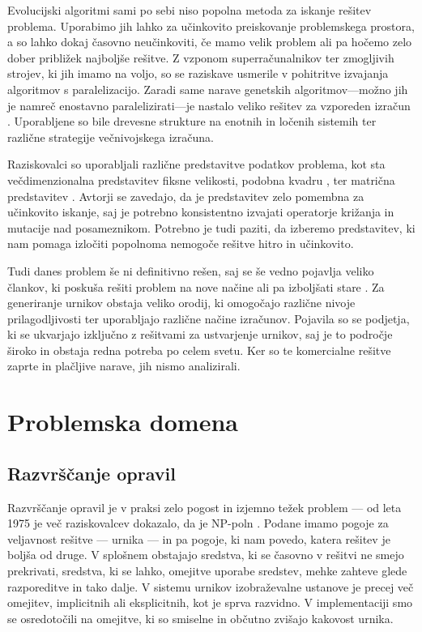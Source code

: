 \documentclass[a4paper,12pt]{book}
\begin{document}
Evolucijski algoritmi sami po sebi niso popolna metoda za iskanje rešitev problema. Uporabimo jih lahko za učinkovito preiskovanje problemskega prostora, a so lahko dokaj časovno neučinkoviti, če mamo velik problem ali pa hočemo zelo dober približek najboljše rešitve. Z vzponom superračunalnikov ter zmogljivih strojev, ki jih imamo na voljo, so se raziskave usmerile v pohitritve izvajanja algoritmov s paralelizacijo. Zaradi same narave genetskih algoritmov---možno jih je namreč enostavno paralelizirati---je nastalo veliko rešitev za vzporeden izračun \cite{alba2002parallelism, abramson1991parallel}. Uporabljene so bile drevesne strukture na enotnih in ločenih sistemih ter različne strategije večnivojskega izračuna. 

Raziskovalci so uporabljali različne predstavitve podatkov problema, kot sta večdimenzionalna predstavitev fiksne velikosti, podobna kvadru \cite{sigl2003solving}, ter matrična predstavitev \cite{colorni1992genetic}. Avtorji se zavedajo, da je predstavitev zelo pomembna za učinkovito iskanje, saj je potrebno konsistentno izvajati operatorje križanja in mutacije nad posameznikom. Potrebno je tudi paziti, da izberemo predstavitev, ki nam pomaga izločiti popolnoma nemogoče rešitve hitro in učinkovito. 

Tudi danes problem še ni definitivno rešen, saj se še vedno pojavlja veliko člankov, ki poskuša rešiti problem na nove načine ali pa izboljšati stare \cite{dun2014simulated,ansari2015comparing}. Za generiranje urnikov obstaja veliko orodij, ki omogočajo različne nivoje prilagodljivosti ter uporabljajo različne načine izračunov. Pojavila so se podjetja, ki se ukvarjajo izključno z rešitvami za ustvarjenje urnikov, saj je to področje široko in obstaja redna potreba po celem svetu. Ker so te komercialne rešitve zaprte in plačljive narave, jih nismo analizirali. 



\chapter{Problemska domena}

\section{Razvrščanje opravil}
Razvrščanje opravil je v praksi zelo pogost in izjemno težek problem --- od leta 1975 je več raziskovalcev dokazalo, da je NP-poln \cite{even1975complexity,cooper1996complexity,sigl2003solving}. Podane imamo pogoje za veljavnost rešitve --- urnika --- in pa pogoje, ki nam povedo, katera rešitev je boljša od druge. V splošnem obstajajo sredstva, ki se časovno v rešitvi ne smejo prekrivati, sredstva, ki se lahko, omejitve uporabe sredstev, mehke zahteve glede razporeditve in tako dalje. V sistemu urnikov izobraževalne ustanove je precej več omejitev, implicitnih ali eksplicitnih, kot je sprva razvidno. V implementaciji smo se osredotočili na omejitve, ki so smiselne in občutno zvišajo kakovost urnika. 
\end{document}
